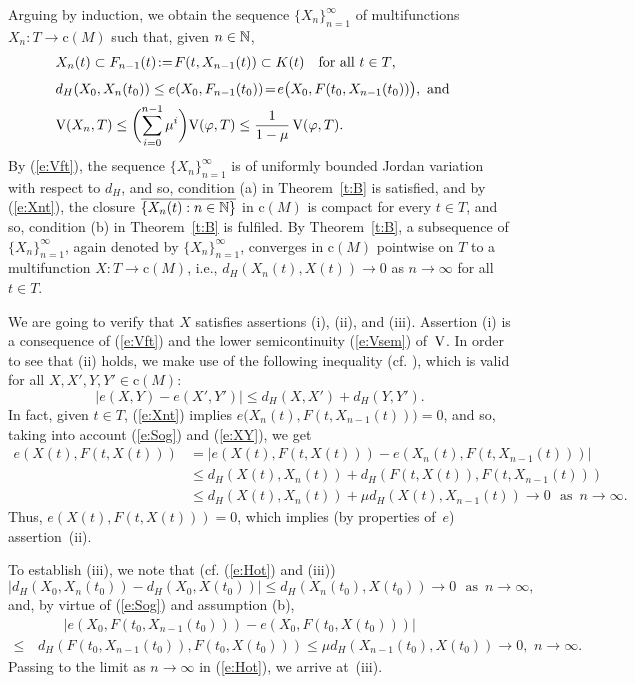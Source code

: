 \documentclass[preprint,12pt]{elsarticle}
\newcommand{\eq}[1]{\mbox{\rm(\ref{#1})}}
\newcommand{\nV}{\mbox{\rm V}}
\newcommand{\ov}[1]{\overline{#1}}
\begin{document}
\begin{pf}
Arguing by induction, we obtain the sequence $\{X_n\}_{n=1}^\infty$ of multifunctions
$X_n:T\to\mbox{c}(M)$ such that, given $n\in\mathbb{N}$,
  \begin{eqnarray}
&X_n(t)\subset F_{n-1}(t)\!:=\!F(t,X_{n-1}(t))\subset K(t)\quad\mbox{for all $t\in T$,}&
  \label{e:Xnt}\\[3pt]
&d_H(X_0,X_n(t_0))\le e(X_0,F_{n-1}(t_0))\!=\!e\bigl(X_0,F(t_0,X_{n-1}(t_0))\bigr),
  \,\,\mbox{and}& \label{e:Hot}\\
&\displaystyle\nV(X_n,T)\le\biggl(\sum_{i=0}^{n-1}\mu^i\biggr)\nV(\varphi,T)
  \le\frac1{1-\mu}\,\nV(\varphi,T).& \label{e:Vft}
  \end{eqnarray}
By \eq{e:Vft}, the sequence $\{X_n\}_{n=1}^\infty$ is of uniformly bounded Jordan
variation with respect to $d_H$, and so, condition (a) in Theorem~\ref{t:B} is satisfied,
and by \eq{e:Xnt}, the closure $\ov{\{X_n(t):n\in\Nb\}}$ in $\mbox{c}(M)$ is compact
for every $t\in T$, and so, condition (b) in Theorem~\ref{t:B} is fulfiled.
By Theorem~\ref{t:B}, a subsequence of $\{X_n\}_{n=1}^\infty$, again denoted by
$\{X_n\}_{n=1}^\infty$, converges in $\mbox{c}(M)$ pointwise on $T$ to a
multifunction $X:T\to\mbox{c}(M)$, i.e., $d_H(X_n(t),X(t))\to0$ as $n\to\infty$
for all $t\in T$.

We are going to verify that $X$ satisfies assertions (i), (ii), and (iii). Assertion (i)
is a consequence of \eq{e:Vft} and the lower semicontinuity \eq{e:Vsem} of~$\nV$.
In order to see that (ii) holds, we make use of the following inequality
(cf. \cite[inequality~(11.7)]{Sovae}), which is valid for all $X,X',Y,Y'\in\mbox{c}(M)$:
  \begin{equation} \label{e:Sog}
|e(X,Y)-e(X',Y')|\le d_H(X,X')+d_H(Y,Y').
  \end{equation}
In fact, given $t\in T$, \eq{e:Xnt} implies $e\bigl(X_n(t),F(t,X_{n-1}(t))\bigr)=0$,
and so, taking into account \eq{e:Sog} and \eq{e:XY}, we get
  \begin{align*}
e(X(t),F(t,X(t)))&\!=\!\bigl|e(X(t),F(t,X(t)))\!-\!e(X_n(t),F(t,X_{n-1}(t)))\bigr|\\[2pt]
&\!\le\! d_H(X(t),X_n(t))\!+\!d_H(F(t,X(t)),F(t,X_{n-1}(t)))\\[2pt]
&\!\le\! d_H(X(t),X_n(t))\!+\!\mu d_H(X(t),X_{n-1}(t))\to0
  \,\,\,\,\mbox{as}\,\,\,n\to\infty.
  \end{align*}
Thus, $e(X(t),F(t,X(t)))=0$, which implies (by properties of~$e$) assertion~(ii).

To establish (iii), we note that (cf. \eq{e:Hot} and (iii))
  \begin{equation*}
|d_H(X_0,X_n(t_0))-d_H(X_0,X(t_0))|\le d_H(X_n(t_0),X(t_0))\to0
  \,\,\,\,\mbox{as}\,\,\,n\to\infty,
  \end{equation*}
and, by virtue of \eq{e:Sog} and assumption (b),
  \begin{align*}
&\qquad\bigl|e(X_0,F(t_0,X_{n-1}(t_0)))-e(X_0,F(t_0,X(t_0)))\bigr|\\[2pt]
\le&\,d_H(F(t_0,X_{n-1}(t_0)),F(t_0,X(t_0)))\le\mu d_H(X_{n-1}(t_0),X(t_0))
  \to0,\,\,n\to\infty.
  \end{align*}
Passing to the limit as $n\to\infty$ in \eq{e:Hot}, we arrive at~(iii).


\end{pf}
\end{document}
